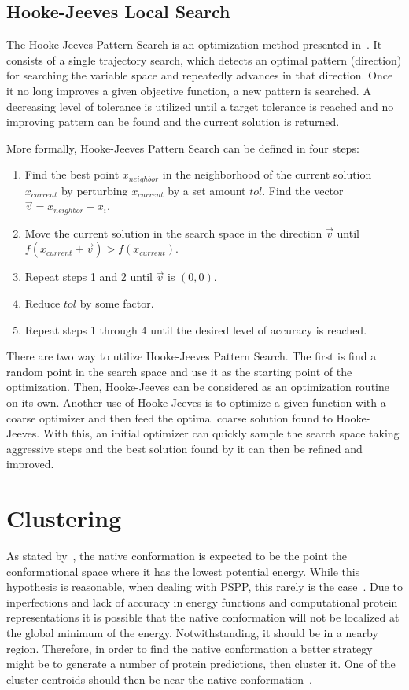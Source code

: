 \subsection{Hooke-Jeeves Local Search}

The Hooke-Jeeves Pattern Search is an optimization method presented
in~\cite{hooke1961direct}. It consists of a single trajectory search, which
detects an optimal pattern (direction) for searching the variable space and
repeatedly advances in that direction. Once it no long improves a given
objective function, a new pattern is searched. A decreasing level of tolerance
is utilized until a target tolerance is reached and no improving pattern can be
found and the current solution is returned.

More formally, Hooke-Jeeves Pattern Search can be defined in four steps:
\begin{enumerate}
    \item Find the best point $x_{neighbor}$ in the neighborhood of the current
    solution $x_{current}$ by perturbing $x_{current}$ by a set amount $tol$.
    Find the vector $\vec{v} = x_{neighbor} - x_i$.
    \item Move the current solution in the search space in the direction $\vec{v}$
    until $f(x_{current} + \vec{v}) > f(x_{current})$.
    \item Repeat steps 1 and 2 until $\vec{v}$ is $(0, 0)$.
    \item Reduce $tol$ by some factor.
    \item Repeat steps 1 through 4 until the desired level of accuracy is reached.
\end{enumerate}

There are two way to utilize Hooke-Jeeves Pattern Search. The first is find a
random point in the search space and use it as the starting point of the optimization.
Then, Hooke-Jeeves can be considered as an optimization routine on its own. Another
use of Hooke-Jeeves is to optimize a given function with a coarse optimizer and then
feed the optimal coarse solution found to Hooke-Jeeves. With this, an initial
optimizer can quickly sample the search space taking aggressive steps and the best
solution found by it can then be refined and improved.

\section{Clustering}
\label{sec:clustering}

As stated by~, the native conformation is
expected to be the point the conformational space where it has the lowest
potential energy. While this hypothesis is reasonable, when dealing with
\ac{PSPP}, this rarely is the case~\cite{shortle1998clustering}. Due to
inperfections and lack of accuracy in energy functions and computational
protein representations it is possible that the native conformation will not be
localized at the global minimum of the energy. Notwithstanding, it should be
in a nearby region. Therefore, in order to find the native conformation a better
strategy might be to generate a number of protein predictions, then cluster it.
One of the cluster centroids should then be near the native
conformation~\cite{zhang2004spicker}.

